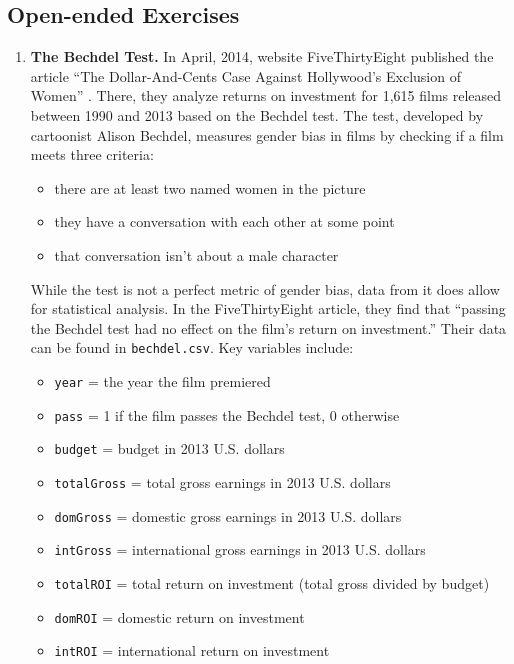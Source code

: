 \documentclass[
]{krantz}
\providecommand{\tightlist}{%
  \setlength{\itemsep}{0pt}\setlength{\parskip}{0pt}}
\begin{document}
\hypertarget{open-ended-exercises}{%
\subsection{Open-ended Exercises}\label{open-ended-exercises}}

\begin{enumerate}
\def\labelenumi{\arabic{enumi}.}
\item
  \textbf{The Bechdel Test.} In April, 2014, website FiveThirtyEight published the article ``The Dollar-And-Cents Case Against Hollywood's Exclusion of Women'' \citep{Hickey2014}. There, they analyze returns on investment for 1,615 films released between 1990 and 2013 based on the Bechdel test. The test, developed by cartoonist Alison Bechdel, measures gender bias in films by checking if a film meets three criteria:

  \begin{itemize}
  \tightlist
  \item
    there are at least two named women in the picture
  \item
    they have a conversation with each other at some point
  \item
    that conversation isn't about a male character
  \end{itemize}

  While the test is not a perfect metric of gender bias, data from it does allow for statistical analysis. In the FiveThirtyEight article, they find that ``passing the Bechdel test had no effect on the film's return on investment.'' Their data can be found in \texttt{bechdel.csv}. Key variables include:

  \begin{itemize}
  \tightlist
  \item
    \texttt{year} = the year the film premiered
  \item
    \texttt{pass} = 1 if the film passes the Bechdel test, 0 otherwise
  \item
    \texttt{budget} = budget in 2013 U.S. dollars
  \item
    \texttt{totalGross} = total gross earnings in 2013 U.S. dollars
  \item
    \texttt{domGross} = domestic gross earnings in 2013 U.S. dollars
  \item
    \texttt{intGross} = international gross earnings in 2013 U.S. dollars
  \item
    \texttt{totalROI} = total return on investment (total gross divided by budget)
  \item
    \texttt{domROI} = domestic return on investment
  \item
    \texttt{intROI} = international return on investment
  \end{itemize}


\end{enumerate}
\end{document}
